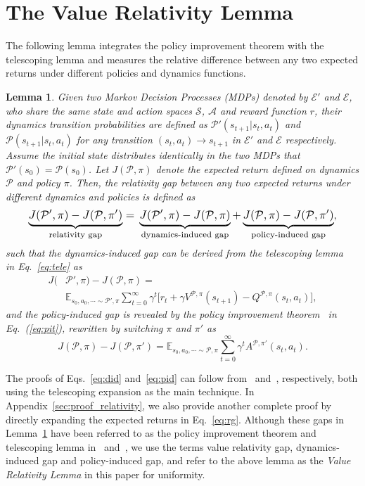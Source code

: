 \documentclass[letterpaper]{article} %
\def\E{{\mathbb{E}}}
\def\P{{\mathcal{P}}}
\def\A{{\mathcal{A}}}
\def\S{{\mathcal{S}}}
\newtheorem{lemma}[theorem]{Lemma}
\begin{document}
\section{The Value Relativity Lemma}
The following lemma integrates the policy improvement theorem with the telescoping lemma and measures the relative difference between any two expected returns under different policies and dynamics functions.

\begin{lemma}
\label{theo:main}
Given two Markov Decision Processes (MDPs) denoted by $\mathcal{E}'$ and $\mathcal{E}$, who share the same state and action spaces $\S$, $\A$ and reward function $r$, their dynamics transition probabilities are defined as $\P'(s_{t+1}|s_t,a_t)$ and $\P(s_{t+1}|s_t,a_t)$ for any transition $(s_t, a_t)\xrightarrow{}s_{t+1}$ in $\mathcal{E}'$ and $\mathcal{E}$ respectively. Assume the initial state distributes identically in the two MDPs that $\P'(s_0)=\P(s_0)$. Let $J(\P,\pi)$ denote the expected return defined on dynamics $\P$ and policy $\pi$. Then, the relativity gap between any two expected returns under different dynamics and policies is defined as
\begin{equation}
\resizebox{.9\hsize}{!}{$
\underbrace{J(\P',\pi)-J(\P,\pi')}_{\text{relativity gap}}
= \\
\underbrace{J(\P',\pi)-J(\P,\pi)}_{\text{dynamics-induced gap}} +\underbrace{J(\P,\pi)-J(\P,\pi')}_{\text{policy-induced gap}}
$},
\label{eq:rg}
\end{equation}
such that the dynamics-induced gap can be derived from the telescoping lemma~\citep{luo2018algorithmic} in Eq.~\eqref{eq:tele} as
{\small
\begin{equation}
\begin{aligned}
J(&\P',\pi) - J(\P,\pi)= \\
&\E_{s_0,a_0,\cdots\sim \P',\pi}
\sum_{t=0}^\infty
\gamma^t
\big[
r_t
+\gamma V^{\P,\pi}(s_{t+1})-Q^{\P,\pi}(s_t,a_t)
\big],
\label{eq:did}
\end{aligned}
\end{equation}
}and the policy-induced gap is revealed by the policy improvement theorem~\citep{kakade2002} in Eq.~(\ref{eq:pit}), rewritten by switching $\pi$ and $\pi'$ as
{\small
\begin{equation}
J(\P,\pi)-J(\P,\pi')=\E_{s_0,a_0,\cdots\sim\P,\pi}
\sum_{t=0}^\infty\gamma^t A^{\P,\pi'}(s_t,a_t).
\label{eq:pid}
\end{equation}
}
\end{lemma}
The proofs of Eqs.~\eqref{eq:did} and~\eqref{eq:pid} can follow from~\citep{luo2018algorithmic} and~\citep{kakade2002}, respectively, both using the telescoping expansion as the main technique.
In Appendix~\ref{sec:proof_relativity}, we also provide another complete proof by directly expanding the expected returns in Eq.~\eqref{eq:rg}.
Although these gaps in Lemma~\ref{theo:main} have been referred to as the policy improvement theorem and telescoping lemma in~\citep{luo2018algorithmic} and~\citep{kakade2002}, we use the terms value relativity gap, dynamics-induced gap and policy-induced gap, and refer to the above lemma as the \emph{Value Relativity Lemma} in this paper for uniformity.
\end{document}
